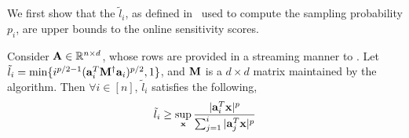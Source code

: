 We first show that the $\tilde{l}_{i}$, as defined in \online~used to compute the sampling probability $p_{i}$, are upper bounds to the online sensitivity scores. 
% 
\begin{lemma}{\label{lemma:onlineSensitivityBound}}
 Consider $\mathbf{A} \in \mathbb{R}^{n \times d}$, whose rows are provided in a streaming manner to \online. Let $\tilde{l}_i = \min\{i^{p/2-1}(\mathbf{a}_{i}^T\mathbf{M}^{\dagger}\mathbf{a}_{i})^{p/2},1\}$, and $\mathbf{M}$ is a $d \times d$ matrix maintained by the algorithm. Then $\forall i \in [n]$,  $\tilde{l}_i$ satisfies the following,
 \begin{equation*}
  \tilde{l}_i \ge \sup_{\mathbf{x}}\frac{|\mathbf{a}_{i}^T\mathbf{x}|^{p}}{\sum_{j=1}^{i}|\mathbf{a}_{j}^T\mathbf{x}|^{p}}
 \end{equation*}
\end{lemma}

